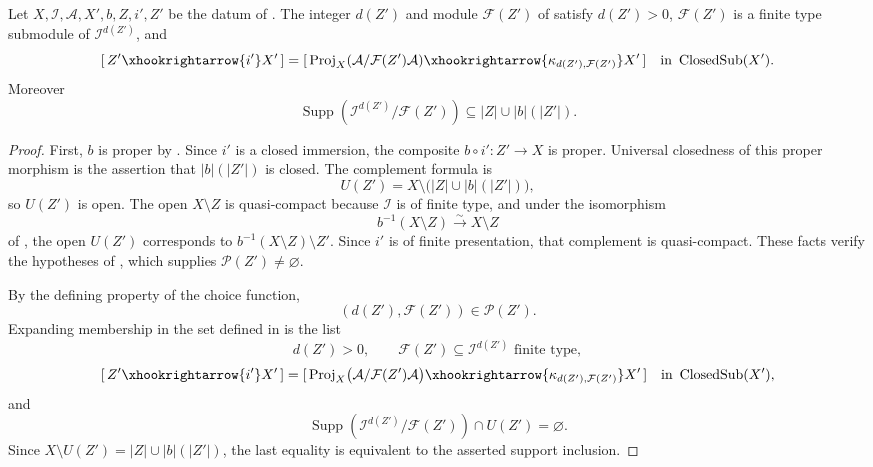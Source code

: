 \begin{lemma}
  \label{lemma:nagata-proj-closed-center-finite-degree}
  \lean{}

  Let $X,\mathcal I,\mathcal A,X',b,Z,i',Z'$ be the datum of
  .
  The integer $d(Z')$ and module $\mathcal F(Z')$ of
   satisfy
  $d(Z')>0$, $\mathcal F(Z')$ is a finite
  type submodule of $\mathcal I^{d(Z')}$, and
  \[
    [\,Z'\xhookrightarrow{i'}X'\,]
      =[\,\operatorname{Proj}_X
        (\mathcal A/\mathcal F(Z')\mathcal A)
        \xhookrightarrow{\kappa_{d(Z'),\mathcal F(Z')}}X'\,]
      \quad\text{in }\operatorname{ClosedSub}(X').
  \]
  Moreover
  \[
    \operatorname{Supp}
      (\mathcal I^{d(Z')}/\mathcal F(Z'))
      \subseteq |Z|\cup |b|(|Z'|).
  \]
\end{lemma}

\begin{proof}
  First, $b$ is proper by
  .  Since $i'$ is a closed immersion,
  the composite $b\circ i'\colon Z'\to X$ is proper.  Universal closedness
  of this proper morphism is the assertion that $|b|(|Z'|)$ is closed.  The
  complement formula is
  \[
    U(Z')=X\setminus\bigl(|Z|\cup |b|(|Z'|)\bigr),
  \]
  so $U(Z')$ is open.  The open $X\setminus Z$ is quasi-compact
  because $\mathcal I$ is of finite type, and under the isomorphism
  \[
    b^{-1}(X\setminus Z)\xrightarrow{\sim}X\setminus Z
  \]
  of , the open
  $U(Z')$ corresponds to
  $b^{-1}(X\setminus Z)\setminus Z'$.  Since $i'$ is of finite presentation,
  that complement is quasi-compact.  These facts verify the hypotheses of
  \cite[Tag 0803]{stacks-project}, which supplies
  $\mathcal P(Z')\ne\varnothing$.

  By the defining property of the choice function,
  \[
    (d(Z'),\mathcal F(Z'))\in\mathcal P(Z').
  \]
  Expanding membership in the set defined in
   is the list
  \[
    d(Z')>0,\qquad
    \mathcal F(Z')\subseteq\mathcal I^{d(Z')}
      \text{ finite type},
  \]
  \[
    [\,Z'\xhookrightarrow{i'}X'\,]
      =[\,\operatorname{Proj}_X
        \bigl(\mathcal A/\mathcal F(Z')\mathcal A\bigr)
        \xhookrightarrow{\kappa_{d(Z'),\mathcal F(Z')}}X'\,]
      \quad\text{in }\operatorname{ClosedSub}(X'),
  \]
  and
  \[
    \operatorname{Supp}
      (\mathcal I^{d(Z')}/\mathcal F(Z'))
      \cap U(Z')=\varnothing.
  \]
  Since $X\setminus U(Z')=|Z|\cup |b|(|Z'|)$, the last equality is equivalent
  to the asserted support inclusion.
\end{proof}

